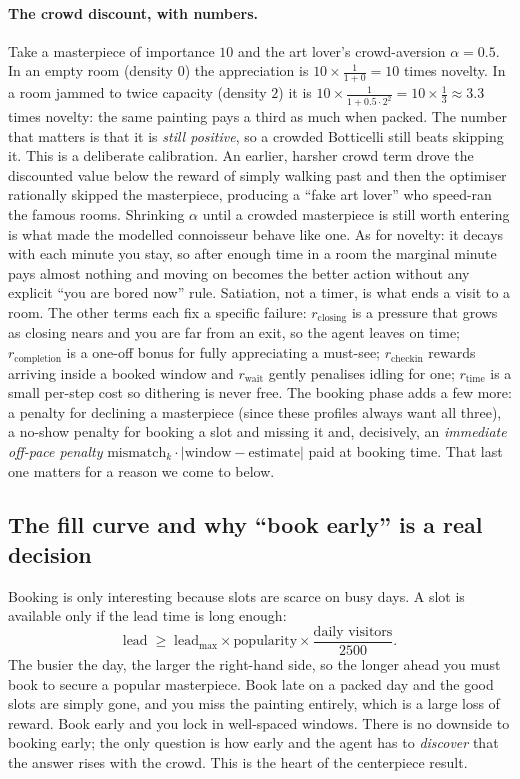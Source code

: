 \documentclass[11pt]{article}
\newcommand{\key}[1]{\textit{#1}}            %
\begin{document}
\paragraph{The crowd discount, with numbers.} Take a masterpiece of importance $10$ and the
art lover's crowd-aversion $\alpha = 0.5$. In an empty room (density $0$) the appreciation
is $10 \times \tfrac{1}{1+0} = 10$ times novelty. In a room jammed to twice capacity
(density $2$) it is $10 \times \tfrac{1}{1 + 0.5\cdot 2^2} = 10\times\tfrac{1}{3} \approx 3.3$
times novelty: the same painting pays a third as much when packed. The number that matters
is that it is \emph{still positive}, so a crowded Botticelli still beats skipping it. This is
a deliberate calibration. An earlier, harsher crowd term drove the discounted value below the
reward of simply walking past and then the optimiser rationally skipped the masterpiece,
producing a ``fake art lover'' who speed-ran the famous rooms. Shrinking $\alpha$ until a
crowded masterpiece is still worth entering is what made the modelled connoisseur behave like
one. As for novelty: it decays with each minute you stay, so after enough time in a room the
marginal minute pays almost nothing and moving on becomes the better action without any
explicit ``you are bored now'' rule. Satiation, not a timer, is what ends a visit to a room. The other terms each fix a specific failure: $r_{\text{closing}}$ is a pressure that
grows as closing nears and you are far from an exit, so the agent leaves on time;
$r_{\text{completion}}$ is a one-off bonus for fully appreciating a must-see;
$r_{\text{checkin}}$ rewards arriving inside a booked window and $r_{\text{wait}}$ gently
penalises idling for one; $r_{\text{time}}$ is a small per-step cost so dithering is never
free. The booking phase adds a few more: a penalty for declining a masterpiece (since these
profiles always want all three), a no-show penalty for booking a slot and missing it and,
decisively, an \key{immediate off-pace penalty} $\text{mismatch}_k \cdot |\text{window} -
\text{estimate}|$ paid at booking time. That last one matters for a reason we come to
below.

\subsection{The fill curve and why ``book early'' is a real decision}

Booking is only interesting because slots are scarce on busy days. A slot is available only
if the lead time is long enough:
\begin{equation}
\text{lead} \;\ge\; \text{lead}_{\max} \times \text{popularity} \times \frac{\text{daily visitors}}{2500}.
\label{eq:fill}
\end{equation}
The busier the day, the larger the right-hand side, so the longer ahead you must book to
secure a popular masterpiece. Book late on a packed day and the good slots are simply gone,
and you miss the painting entirely, which is a large loss of reward. Book early and you
lock in well-spaced windows. There is no downside to booking early; the only question is
how early and the agent has to \emph{discover} that the answer rises with the crowd. This
is the heart of the centerpiece result.
\end{document}
